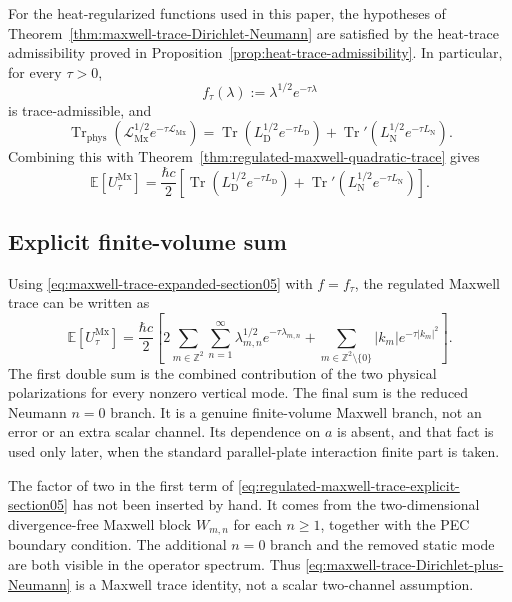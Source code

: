 \documentclass[11pt]{article}
\providecommand{\Z}{\mathbb{Z}}
\providecommand{\hbarc}{\hbar c}
\providecommand{\E}{\mathbb{E}}
\providecommand{\Tr}{\operatorname{Tr}}
\providecommand{\Trphys}{\operatorname{Tr}_{\mathrm{phys}}}
\providecommand{\abs}[1]{\left\lvert #1\right\rvert}
\providecommand{\paren}[1]{\left(#1\right)}
\providecommand{\LMx}{\mathcal L_{\mathrm{Mx}}}
\providecommand{\LD}{L_{\mathrm D}}
\providecommand{\LN}{L_{\mathrm N}}
\providecommand{\lambdamn}{\lambda_{m,n}}
\providecommand{\UtauMx}{U_{\tau}^{\mathrm{Mx}}}
\numberwithin{equation}{section}
\begin{document}
For the heat-regularized functions used in this paper, the hypotheses of
Theorem~\ref{thm:maxwell-trace-Dirichlet-Neumann} are satisfied by the
heat-trace admissibility proved in Proposition~\ref{prop:heat-trace-admissibility}.  In particular, for every \(\tau>0\),
\begin{equation}
    f_\tau(\lambda):=\lambda^{1/2}e^{-\tau\lambda}
    \label{eq:f-tau-sqrt-heat-section05}
\end{equation}
is trace-admissible, and
\begin{equation}
    \Trphys\paren{\LMx^{1/2}e^{-\tau\LMx}}
    =
    \Tr\paren{\LD^{1/2}e^{-\tau\LD}}
    +
    \Tr'\paren{\LN^{1/2}e^{-\tau\LN}} .
    \label{eq:regulated-maxwell-trace-LD-LN-section05}
\end{equation}
Combining this with Theorem~\ref{thm:regulated-maxwell-quadratic-trace} gives
\begin{equation}
    \boxed{
    \E[\UtauMx]
    =
    \frac{\hbarc}{2}
    \left[
        \Tr\paren{\LD^{1/2}e^{-\tau\LD}}
        +
        \Tr'\paren{\LN^{1/2}e^{-\tau\LN}}
    \right].
    }
    \label{eq:regulated-stochastic-trace-LD-LN-section05}
\end{equation}

\subsection{Explicit finite-volume sum}
\label{subsec:explicit-finite-volume-sum-section05}

Using \eqref{eq:maxwell-trace-expanded-section05} with
\(f=f_\tau\), the regulated Maxwell trace can be written as
\begin{equation}
    \E[\UtauMx]
    =
    \frac{\hbarc}{2}
    \left[
        2\sum_{m\in\Z^2}\sum_{n=1}^{\infty}
        \lambdamn^{1/2}e^{-\tau\lambdamn}
        +
        \sum_{m\in\Z^2\setminus\{0\}}
        \abs{k_m}e^{-\tau\abs{k_m}^2}
    \right].
    \label{eq:regulated-maxwell-trace-explicit-section05}
\end{equation}
The first double sum is the combined contribution of the two physical
polarizations for every nonzero vertical mode.  The final sum is the reduced
Neumann \(n=0\) branch.  It is a genuine finite-volume Maxwell branch, not an
error or an extra scalar channel.  Its dependence on \(a\) is absent, and that
fact is used only later, when the standard parallel-plate interaction finite
part is taken.

\begin{remark}
\label{rem:no-scalar-doubling-shortcut-section05}
The factor of two in the first term of
\eqref{eq:regulated-maxwell-trace-explicit-section05} has not been inserted by
hand.  It comes from the two-dimensional divergence-free Maxwell block
\(W_{m,n}\) for each \(n\geq1\), together with the PEC boundary condition.  The
additional \(n=0\) branch and the removed static mode are both visible in the
operator spectrum.  Thus \eqref{eq:maxwell-trace-Dirichlet-plus-Neumann} is a
Maxwell trace identity, not a scalar two-channel assumption.
\end{remark}
\end{document}
